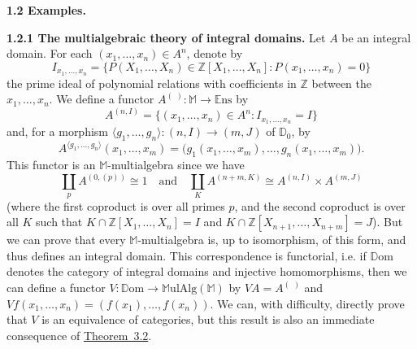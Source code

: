 \documentclass{article}
\newenvironment{rmenv}[1]
  {\phantomsection\par\medskip\noindent\textbf{#1.}\rmfamily}
  {\medskip}
\newcommand{\bb}[1]{{\mathbb{#1}}}
\newcommand{\Set}{\mathbb{E}\mathrm{ns}}
\newcommand{\MulAlg}{\mathbb{M}\mathrm{ulAlg}}
\newcommand{\Dom}{\mathbb{D}\mathrm{om}}
\newcommand{\oldpage}[1]{\marginpar{\footnotesize$\Big\vert$ \textit{p.~#1}}}
\begin{document}
\begin{rmenv}{1.2 Examples}
\begin{rmenv}{1.2.1 The multialgebraic theory of integral domains}
\oldpage{195}
    Let $A$ be an integral domain.
    For each $(x_1,\ldots,x_n)\in A^n$, denote by
    \[
      I_{x_1,\ldots,x_n} =
      \big\{
        P(X_1,\ldots,X_n)\in\bb{Z}[X_1,\ldots,X_n]
        :
        P(x_1,\ldots,x_n)=0
      \big\}
    \]
    the prime ideal of polynomial relations with coefficients in $\bb{Z}$ between the $x_1,\ldots,x_n$.
    We define a functor $A^{(\,\,)}\colon\bb{M}\to\Set$ by
    \[
      A^{(n,I)}=\{(x_1,\ldots,x_n)\in A^n:I_{x_1,\ldots,x_n}=I\}
    \]
    and, for a morphism $\langle g_1,\ldots,g_n\rangle\colon(n,I)\to(m,J)$ of $\bb{D}_0$, by
    \[
      A^{\langle g_1,\ldots,g_n\rangle}(x_1,\ldots,x_m) =
      \big(
        g_1(x_1,\ldots,x_m),
        \ldots,
        g_n(x_1,\ldots,x_m)
      \big).
    \]
    This functor is an $\bb{M}$-multialgebra since we have
    \[
      \coprod_p A^{(0,(p))} \cong 1
      \quad\text{and}\quad
      \coprod_K A^{(n+m,K)} \cong A^{(n,I)}\times A^{(m,J)}
    \]
    (where the first coproduct is over all primes $p$, and the second coproduct is over all $K$ such that $K\cap\bb{Z}[X_1,\ldots,X_n] = I$ and $K\cap\bb{Z}[X_{n+1},\ldots,X_{n+m}] = J$).
    But we can prove that every $\bb{M}$-multialgebra is, up to isomorphism, of this form, and thus defines an integral domain.
    This correspondence is functorial, i.e. if $\Dom$ denotes the category of integral domains and injective homomorphisms, then we can define a functor $V\colon\Dom\to\MulAlg(\bb{M})$ by $VA=A^{(\,\,)}$ and $Vf(x_1,\ldots,x_n)=(f(x_1),\ldots,f(x_n))$.
    We can, with difficulty, directly prove that $V$ is an equivalence of categories, but this result is also an immediate consequence of \hyperref[3.2]{Theorem~3.2}.
  \end{rmenv}


\end{rmenv}
\end{document}

